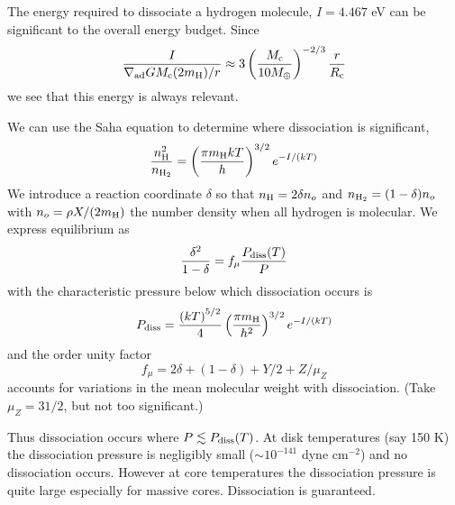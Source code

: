\documentclass[12pt, preprint,numberedappendix]{emulateapj}
\newcommand{\co}{_{\rm c}}
\begin{document}
The energy required to dissociate a hydrogen molecule, $I = 4.467$ eV can be significant to the overall energy budget.
Since
\begin{equation}
{I \over \nabla_{\rm ad} G M\co (2 m_{\rm H})/r} \approx 3 \left(M\co \over 10 M_\oplus \right)^{-2/3} {r \over R_{\rm c}}
\end{equation} 
we see that this energy is always relevant.

We can use the Saha equation to determine where dissociation is significant,
\begin{equation}
{n_{\rm H}^2 \over n_{\rm H_2}} = \left(\pi m_{\rm H} k T \over h \right)^{3/2} e^{-I/(kT)}
\end{equation} 
We introduce a reaction coordinate $\delta$ so that $n_{\rm H} = 2 \delta n_o$ and $n_{\rm H_2} = (1-\delta) n_o$ with $n_o = \rho X/(2 m_{\rm H})$ the number density when all hydrogen is molecular.  We express equilibrium as
\begin{equation}
{\delta^2 \over 1-\delta} = f_\mu {P_{\rm diss}(T) \over P}
\end{equation} 
with the characteristic pressure below which dissociation occurs is
\begin{equation}
P_{\rm diss} = {\left(kT\right)^{5/2} \over 4} \left( \pi m_{\rm H} \over h^2\right)^{3/2}  e^{-I/(kT)}
\end{equation} 
and the order unity factor
\begin{equation}
f_\mu = 2\delta + (1-\delta) + Y/2 + Z/\mu_Z
\end{equation} 
accounts for variations in the mean molecular weight with dissociation.  (Take $\mu_Z = 31/2$, but not too significant.)

Thus dissociation occurs where $P \lesssim P_{\rm diss}(T)$.  At disk temperatures (say 150 K) the dissociation pressure is negligibly small ($\sim 10^{-141}$ dyne cm$^{-2}$) and no dissociation occurs.  However at core temperatures the dissociation pressure is quite large especially for massive cores.  Dissociation is guaranteed.
\end{document}
